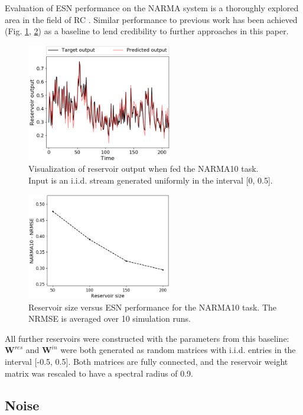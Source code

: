 Evaluation of ESN performance on the NARMA system is a thoroughly explored area
in the field of RC \cite{verstraeten_experimental_2007, rodan_minimum_2011,
jaeger_adaptive_nodate}. Similar performance to previous work has been achieved
(Fig. \ref{visualization}, \ref{performance}) as a baseline to lend credibility
to further approaches in this paper.

\begin{figure}[H]
  \centering
  \includegraphics[width=2.5in]{img/narma_visualization.png}
  \caption{
    Visualization of reservoir output when fed the NARMA10 task. Input is an
i.i.d. stream generated uniformly in the interval [0, 0.5].
  }
  \label{visualization}
\end{figure}

\begin{figure}[H]
  \centering
  \includegraphics[width=2.5in]{img/general_performance.png}
  \caption{
    Reservoir size versus ESN performance for the NARMA10 task. The NRMSE is
averaged over 10 simulation runs.
  }
  \label{performance}
\end{figure}

All further reservoirs were constructed with the parameters from this baseline:
$\mathbf{W}^{res}$ and $\mathbf{W}^{in}$ were both generated as random matrices
with i.i.d. entries in the interval [-0.5, 0.5]. Both matrices are fully
connected, and the reservoir weight matrix was rescaled to have a spectral
radius of 0.9.

\subsection{Noise}

